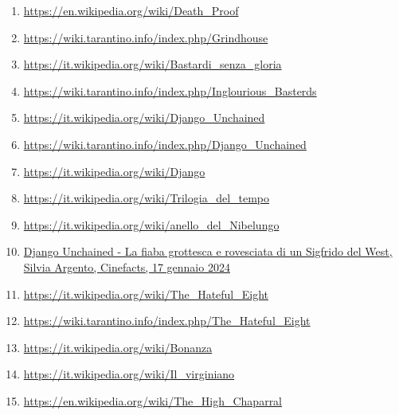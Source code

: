 \documentclass[12pt]{article} %
\begin{document}
\begin{flushleft}
\begin{enumerate}
        \item \href{https://en.wikipedia.org/wiki/Death_Proof}{https://en.wikipedia.org/wiki/Death\_Proof}
        \item \href{https://wiki.tarantino.info/index.php/Grindhouse_movie_references_guide}{https://wiki.tarantino.info/index.php/Grindhouse}
        \item \href{https://it.wikipedia.org/wiki/Bastardi_senza_gloria}{https://it.wikipedia.org/wiki/Bastardi\_senza\_gloria}
        \item \href{https://wiki.tarantino.info/index.php/Inglourious_Basterds_movie_references_guide}{https://wiki.tarantino.info/index.php/Inglourious\_Basterds}
        \item \href{https://it.wikipedia.org/wiki/Django_Unchained}{https://it.wikipedia.org/wiki/Django\_Unchained}
        \item \href{https://wiki.tarantino.info/index.php/Django_Unchained_Movie_References_guide}{https://wiki.tarantino.info/index.php/Django\_Unchained}
        \item \href{https://it.wikipedia.org/wiki/Django_(film_1966)}{https://it.wikipedia.org/wiki/Django}
        \item \href{https://it.wikipedia.org/wiki/Trilogia_del_tempo}{https://it.wikipedia.org/wiki/Trilogia\_del\_tempo}
        \item \href{https://it.wikipedia.org/wiki/L%27anello_del_Nibelungo}{https://it.wikipedia.org/wiki/anello\_del\_Nibelungo}
        \item \href{https://www.cinefacts.it/cinefacts-articolo-1597/django-unchained-la-fiaba-grottesca-e-rovesciata-di-un-sigfrido-del-west.html}{Django Unchained - La fiaba grottesca e rovesciata di un Sigfrido del West, Silvia Argento, Cinefacts, 17 gennaio 2024}
        \item \href{https://it.wikipedia.org/wiki/The_Hateful_Eight}{https://it.wikipedia.org/wiki/The\_Hateful\_Eight}
        \item \href{https://wiki.tarantino.info/index.php/The_Hateful_Eight_Movie_References_guide}{https://wiki.tarantino.info/index.php/The\_Hateful\_Eight}
        \item \href{https://it.wikipedia.org/wiki/Bonanza}{https://it.wikipedia.org/wiki/Bonanza}
        \item \href{https://it.wikipedia.org/wiki/Il_virginiano}{https://it.wikipedia.org/wiki/Il\_virginiano}
        \item \href{https://en.wikipedia.org/wiki/The_High_Chaparral}{https://en.wikipedia.org/wiki/The\_High\_Chaparral}

\end{enumerate}
\end{flushleft}
\end{document}
